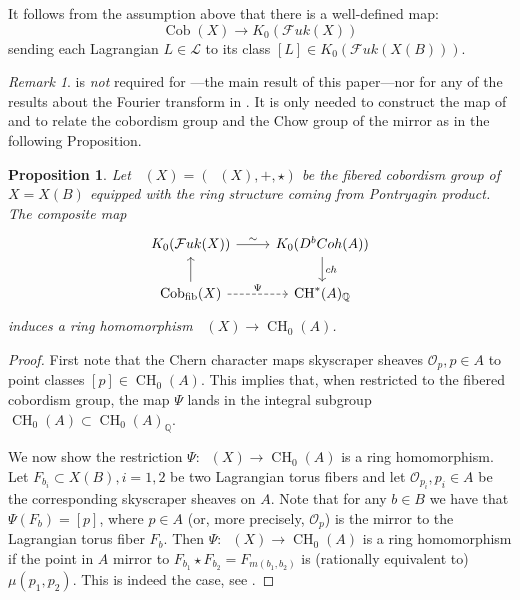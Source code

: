 \documentclass[10pt]{amsart}
\newtheorem{prop}[thm]{Proposition}
\theoremstyle{definition}
\theoremstyle{remark}
\newtheorem{remark}[thm]{Remark}
\def\Q{\mathbb{Q}}
\DeclareMathOperator{\Cob}{Cob}
\DeclareMathOperator{\Cobfib}{\mathrm{Cob}_{\mathrm{fib}}}
\DeclareMathOperator{\CH}{CH}
\newcommand{\mcal}{\mathcal}
\begin{document}
It follows from the assumption above that there is a well-defined map:
\begin{equation}\label{eq:Cob_to_K0}
    \Cob(X) \to K_0(\mcal Fuk(X))
\end{equation}
sending each Lagrangian $L \in \mcal L$ to its class $[L] \in K_0(\mcal Fuk(X(B)))$.
\begin{remark}
     is \emph{not} required for ---the main result of this paper---nor for any of the results about the Fourier transform in .
    It is only needed to construct the map of  and to relate the cobordism group and the Chow group of the mirror as in the following Proposition.
\end{remark}
\begin{prop}\label{prop:Cob_to_CH_ringhom}
    Let $\Cobfib(X) = (\Cobfib(X), +, \star)$ be the fibered cobordism group of $X = X(B)$ equipped with the ring structure coming from Pontryagin product.
    The composite map
    $$
    \begin{tikzcd}
        K_0(\mcal Fuk(X)) \arrow[r,"\sim"] & K_0(D^bCoh(A)) \arrow[d,"ch"] \\
        \Cobfib(X) \arrow[u] \arrow[r,dashed,"\Psi"] & \CH^*(A)_\Q
    \end{tikzcd}
    $$
    induces a ring homomorphism $\Cobfib(X)  \to \CH_0(A)$.
\end{prop}
\begin{proof}
    First note that the Chern character maps skyscraper sheaves $\mcal O_p, p\in A$ to point classes $[p]\in \CH_0(A)$.
    This implies that, when restricted to the fibered cobordism group, the map $\Psi$ lands in the integral subgroup $\CH_0(A) \subset \CH_0(A)_\Q$.

    We now show the restriction  $\Psi: \Cobfib(X)  \to \CH_0(A)$ is a ring homomorphism.
    Let $F_{b_i} \subset X(B), i=1,2$ be two Lagrangian torus fibers and let $\mcal O_{p_i}, p_i \in A$ be the corresponding skyscraper sheaves on $A$.
    Note that for any $b \in B$ we have that  $\Psi(F_{b}) = [p]$, where $p \in A$ (or, more precisely, $\mcal O_p$) is the mirror to the Lagrangian torus fiber $F_b$.
    Then $\Psi:\Cobfib(X)  \to \CH_0(A)$ is a ring homomorphism if the point in $A$ mirror to $F_{b_1}\star F_{b_2}=F_{m(b_1,b_2)}$ is (rationally equivalent to) $\mu(p_1,p_2)$.
This is indeed the case, see .
\end{proof}
\end{document}

